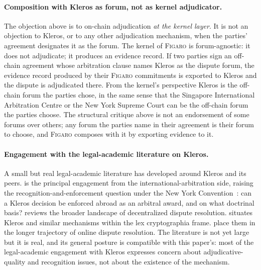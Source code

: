 \documentclass[11pt,a4paper]{article}
\theoremstyle{remark}
\newcommand{\figaro}{\textsc{Figaro}}
\begin{document}
\paragraph{Composition with Kleros as forum, not as kernel
adjudicator.} The objection above is to on-chain adjudication
\emph{at the kernel layer}. It is not an objection to Kleros, or
to any other adjudication mechanism, when the parties' agreement
designates it as the forum. The kernel of \figaro{} is
forum-agnostic: it does not adjudicate; it produces an evidence
record. If two parties sign an off-chain agreement whose
arbitration clause names Kleros as the dispute forum, the
evidence record produced by their \figaro{} commitments is
exported to Kleros and the dispute is adjudicated there. From
the kernel's perspective Kleros is the off-chain forum the
parties chose, in the same sense that the Singapore International
Arbitration Centre or the New York Supreme Court can be the
off-chain forum the parties choose. The structural critique above
is not an endorsement of some forums over others; any forum the
parties name in their agreement is their forum to choose, and
\figaro{} composes with it by exporting evidence to it.

\paragraph{Engagement with the legal-academic literature on Kleros.}
A small but real legal-academic literature has developed around
Kleros and its peers. \citet{ortolani2019blockchain} is the
principal engagement from the international-arbitration side,
raising the recognition-and-enforcement question under the New
York Convention~\citep{nyc1958}: can a Kleros decision be
enforced abroad as an arbitral award, and on what doctrinal
basis? \citet{kaal2020dispute} reviews the broader landscape of
decentralized dispute resolution. \citet{defilippi_wright_2018}
situates Kleros and similar mechanisms within the lex
cryptographia frame. \citet{rabinovich_einy_katsh_2017} place
them in the longer trajectory of online dispute resolution. The
literature is not yet large but it is real, and its general
posture is compatible with this paper's: most of the
legal-academic engagement with Kleros expresses concern about
adjudicative-quality and recognition issues, not about the
existence of the mechanism.
\end{document}
